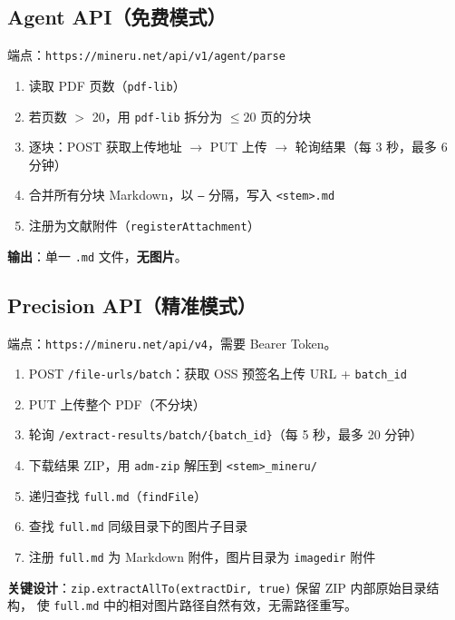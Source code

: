 \documentclass[12pt, a4paper]{article}
\begin{document}
\subsection{Agent API（免费模式）}

端点：\texttt{https://mineru.net/api/v1/agent/parse}

\begin{enumerate}[leftmargin=2em, itemsep=2pt]
  \item 读取 PDF 页数（\texttt{pdf-lib}）
  \item 若页数 $>$ 20，用 \texttt{pdf-lib} 拆分为 $\leq20$ 页的分块
  \item 逐块：POST 获取上传地址 $\to$ PUT 上传 $\to$ 轮询结果（每 3 秒，最多 6 分钟）
  \item 合并所有分块 Markdown，以 \texttt{---} 分隔，写入 \texttt{<stem>.md}
  \item 注册为文献附件（\texttt{registerAttachment}）
\end{enumerate}

\textbf{输出}：单一 \texttt{.md} 文件，\textbf{无图片}。

\subsection{Precision API（精准模式）}

端点：\texttt{https://mineru.net/api/v4}，需要 Bearer Token。

\begin{enumerate}[leftmargin=2em, itemsep=2pt]
  \item POST \texttt{/file-urls/batch}：获取 OSS 预签名上传 URL + \texttt{batch\_id}
  \item PUT 上传整个 PDF（不分块）
  \item 轮询 \texttt{/extract-results/batch/\{batch\_id\}}（每 5 秒，最多 20 分钟）
  \item 下载结果 ZIP，用 \texttt{adm-zip} 解压到 \texttt{<stem>\_mineru/}
  \item 递归查找 \texttt{full.md}（\texttt{findFile}）
  \item 查找 \texttt{full.md} 同级目录下的图片子目录
  \item 注册 \texttt{full.md} 为 Markdown 附件，图片目录为 \texttt{imagedir} 附件
\end{enumerate}

\textbf{关键设计}：\texttt{zip.extractAllTo(extractDir, true)} 保留 ZIP 内部原始目录结构，
使 \texttt{full.md} 中的相对图片路径自然有效，无需路径重写。
\end{document}
